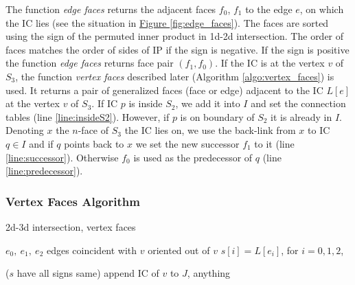 \documentclass{elsarticle}
\newcommand{\fig}[1]{\hyperref[#1]{Figure \ref{#1}}}
\newcommand{\nface}{$n$-face }
\begin{document}
The function \emph{edge faces} returns the adjacent faces $f_0$, $f_1$ to the edge $e$, on which the IC lies (see the situation in \fig{fig:edge_faces}). 
The faces are sorted using the sign of the permuted inner product in 1d-2d intersection. The order of faces matches 
the order of sides of IP if the sign is negative. If the sign is positive the function \emph{edge faces} returns face pair $(f_1, f_0)$.
If the IC is at the vertex $v$ of $S_3$, the function \emph{vertex faces} described later (Algorithm \ref{algo:vertex_faces}) is used.
It returns a pair of generalized faces (face or edge) adjacent to the IC $L[e]$ at the vertex $v$ of $S_3$. 
If IC $p$ is inside $S_2$, we add it into $I$ and set the connection tables (line \ref{line:insideS2}). 
However,
if $p$ is on boundary of $S_2$ it is already in $I$. Denoting $x$ the \nface of $S_3$ the IC lies on, we use the back-link from $x$ to 
IC $q\in I$ and if $q$ points back to $x$ we set the new successor $f_1$ to it (line \ref{line:successor}). 
Otherwise $f_0$ is used as the predecessor of $q$ (line \ref{line:predecessor}). 




\subsubsection{Vertex Faces Algorithm}

\begin{algorithm}
  \caption{2d-3d intersection, vertex faces}  
  \label{algo:vertex_faces}
  
  \DontPrintSemicolon
  $e_0,\ e_1,\ e_2$ edges coincident with $v$ oriented out of $v$
  $s[i] = L[e_i]$, for $i=0,1,2$, \;
  
  
  
  \Else($s$ have all signs same){ 
    append IC of $v$ to $J$, \return anything\;
  }  
\end{algorithm}
\end{document}
